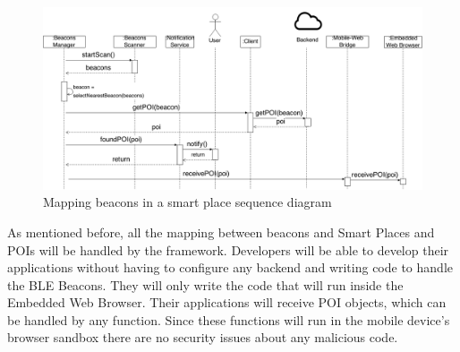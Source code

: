 \begin{figure}[!ht]
  \centering
    \includegraphics[width=1\textwidth]{img/smart-places-poi-sequence}
    \caption{Mapping beacons in a smart place sequence diagram}
    \label{fig:sequence-poi}
\end{figure}

As mentioned before, all the mapping between
beacons and Smart Places and POIs will be handled
by the framework. Developers will be able
to develop their applications without having to
configure any backend and writing code to handle
the BLE Beacons.
They will only write the code
that will run inside the Embedded Web Browser.
Their applications will receive POI objects,
which can be handled by any function. Since
these functions will run in the mobile
device's browser sandbox there are no security
issues about any malicious code.

